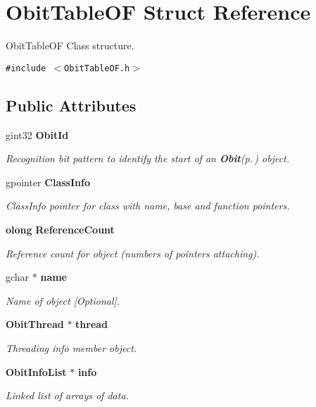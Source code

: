\section{Obit\-Table\-OF Struct Reference}
\label{structObitTableOF}
Obit\-Table\-OF Class structure.  


{\tt \#include $<$Obit\-Table\-OF.h$>$}

\subsection*{Public Attributes}
\begin{CompactItemize}
\item 
gint32 {\bf Obit\-Id}
\begin{CompactList}\small\item\em Recognition bit pattern to identify the start of an {\bf Obit}{\rm (p.\,\pageref{structObit})} object. \item\end{CompactList}\item 
gpointer {\bf Class\-Info}
\begin{CompactList}\small\item\em Class\-Info pointer for class with name, base and function pointers. \item\end{CompactList}\item 
{\bf olong} {\bf Reference\-Count}
\begin{CompactList}\small\item\em Reference count for object (numbers of pointers attaching). \item\end{CompactList}\item 
gchar $\ast$ {\bf name}
\begin{CompactList}\small\item\em Name of object [Optional]. \item\end{CompactList}\item 
{\bf Obit\-Thread} $\ast$ {\bf thread}
\begin{CompactList}\small\item\em Threading info member object. \item\end{CompactList}\item 
{\bf Obit\-Info\-List} $\ast$ {\bf info}
\begin{CompactList}\small\item\em Linked list of arrays of data. \item\end{CompactList}\item 

\end{CompactItemize}
